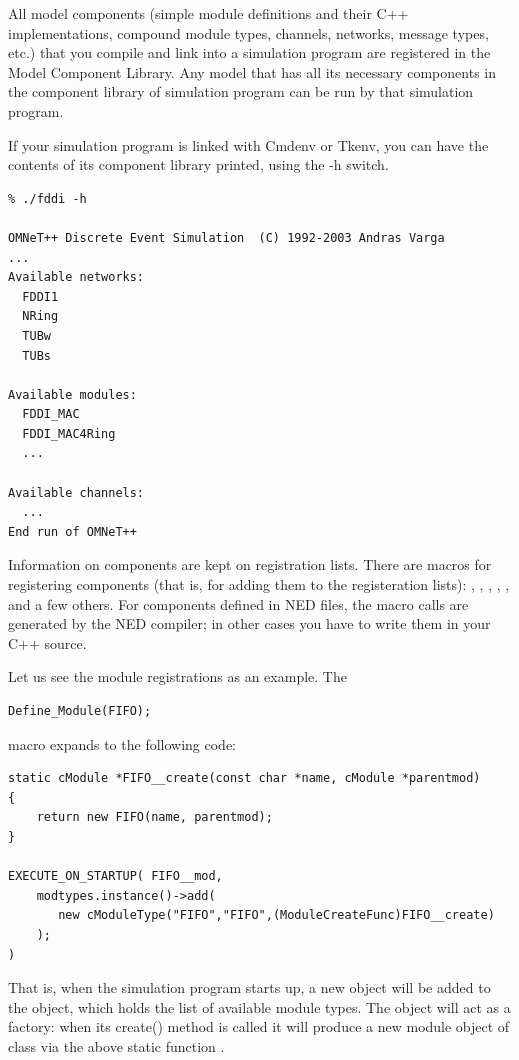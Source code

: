All model components (simple module definitions and their C++
implementations, compound module types, channels, networks,
message types, etc.) that you compile and link into a simulation
program are registered in the Model Component Library.
Any model that has all its necessary components in the
component library of simulation program can be run by that
simulation program.

If your simulation program is linked with Cmdenv or Tkenv,
you can have the contents of its component library printed,
using the -h switch.

\begin{verbatim}
% ./fddi -h

OMNeT++ Discrete Event Simulation  (C) 1992-2003 Andras Varga
...
Available networks:
  FDDI1
  NRing
  TUBw
  TUBs

Available modules:
  FDDI_MAC
  FDDI_MAC4Ring
  ...

Available channels:
  ...
End run of OMNeT++
\end{verbatim}

Information on components are kept on registration lists.
There are macros for registering components (that is, for adding
them to the registeration lists):
, ,
, ,
, and a few others. For components defined
in NED files, the macro calls are generated by the NED compiler;
in other cases you have to write them in your C++ source.

Let us see the module registrations as an example. The

\begin{verbatim}
Define_Module(FIFO);
\end{verbatim}

macro expands to the following code:

\begin{verbatim}
static cModule *FIFO__create(const char *name, cModule *parentmod)
{
    return new FIFO(name, parentmod);
}

EXECUTE_ON_STARTUP( FIFO__mod,
    modtypes.instance()->add(
       new cModuleType("FIFO","FIFO",(ModuleCreateFunc)FIFO__create)
    );
)
\end{verbatim}

That is, when the simulation program starts up, a new 
object will be added to the  object, which holds the list
of available module types. The  object will act as a factory:
when its create() method is called it will produce a new module object
of class  via the above static function .

